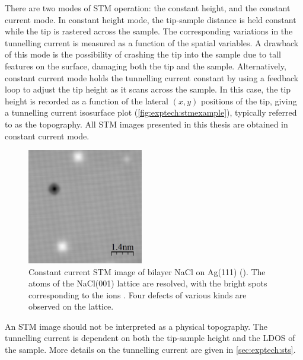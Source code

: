 There are two modes of \ac{STM} operation: the constant height, and the constant current mode. In constant height mode, the tip-sample distance is held constant while the tip is rastered across the sample. The corresponding variations in the tunnelling current is measured as a function of the spatial variables. A drawback of this mode is the possibility of crashing the tip into the sample due to tall features on the surface, damaging both the tip and the sample. Alternatively, constant current mode holds the tunnelling current constant by using a feedback loop to adjust the tip height as it scans across the sample. In this case, the tip height is recorded as a function of the lateral $(x,y)$ positions of the tip, giving a tunnelling current isosurface plot (\autoref{fig:exptech:stmexample}), typically referred to as the topography. All \ac{STM} images presented in this thesis are obtained in constant current mode.

\begin{figure} [h]
    \centering
    \includegraphics[width=0.45\textwidth]{pictures/atomic_NaCl.jpg}
    \caption[Constant current STM image of bilayer NaCl on Ag(111) (). The atoms of the NaCl(001) lattice are resolved, with the bright spots corresponding to the  ions. Various defects are observed on the lattice.]{Constant current STM image of bilayer NaCl on Ag(111) (). The atoms of the NaCl(001) lattice are resolved, with the bright spots corresponding to the  ions \citep{heidorn2013influence}. Four defects of various kinds are observed on the lattice.}
    \label{fig:exptech:stmexample}
\end{figure}

An \ac{STM} image should not be interpreted as a physical topography. The tunnelling current is dependent on both the tip-sample height and the \ac{LDOS} of the sample. More details on the tunnelling current are given in \autoref{sec:exptech:sts}.




